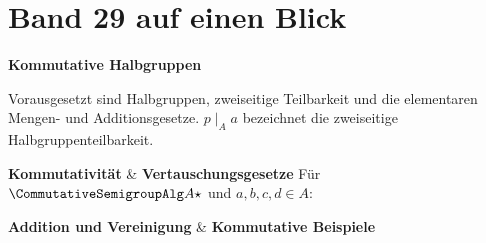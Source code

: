 \chapter[Band 29: Kommutative Halbgruppen]{Band 29 auf einen Blick}
\noindent\textbf{Kommutative Halbgruppen}\par\medskip
Vorausgesetzt sind Halbgruppen, zweiseitige Teilbarkeit und
die elementaren Mengen- und Additionsgesetze. \(p\mid_A a\)
bezeichnet die zweiseitige Halbgruppenteilbarkeit.

\begin{BandUebersicht}
\textbf{Kommutativität}
&
\textbf{Vertauschungsgesetze}
Für \(\CommutativeSemigroupAlg A\star\) und \(a,b,c,d\in A\):
 \\
\addlinespace[.8ex]

\textbf{Addition und Vereinigung}
&
\textbf{Kommutative Beispiele}
 \\
\addlinespace[.8ex]


\end{BandUebersicht}
